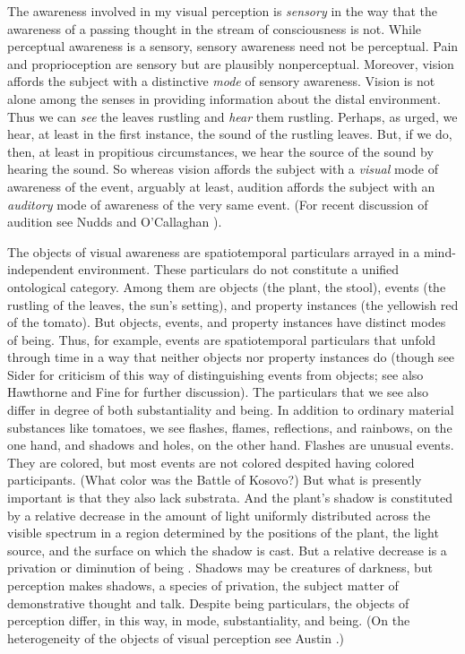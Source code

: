 \documentclass[12pt]{article}
\begin{document}
The awareness involved in my visual perception is \emph{sensory} in the way that the awareness of a passing thought in the stream of consciousness is not. While perceptual awareness is a sensory, sensory awareness need not be perceptual. Pain and proprioception are sensory but are plausibly nonperceptual. Moreover, vision affords the subject with a distinctive \emph{mode} of sensory awareness. Vision is not alone among the senses in providing information about the distal environment. Thus we can \emph{see} the leaves rustling and \emph{hear} them rustling. Perhaps, as \citet[]{Berkeley:1734fk} urged, we hear, at least in the first instance, the sound of the rustling leaves. But, if we do, then, at least in propitious circumstances, we hear the source of the sound by hearing the sound. So whereas vision affords the subject with a \emph{visual} mode of awareness of the event, arguably at least, audition affords the subject with an \emph{auditory} mode of awareness of the very same event. (For recent discussion of audition see Nudds and O'Callaghan \citeyear{Nudds:2009sk}).

The objects of visual awareness are spatiotemporal particulars arrayed in a mind-independent environment. These particulars do not constitute a unified ontological category. Among them are objects (the plant, the stool), events (the rustling of the leaves, the sun's setting), and property instances (the yellowish red of the tomato). But objects, events, and property instances have distinct modes of being. Thus, for example, events are spatiotemporal particulars that unfold through time in a way that neither objects nor property instances do (though see Sider \citeyear{Sider:1997fk} for criticism of this way of distinguishing events from objects; see also Hawthorne \citeyear{Hawthorne:2008uq} and Fine \citeyear{Fine:2006fk} for further discussion). The particulars that we see also differ in degree of both substantiality and being. In addition to ordinary material substances like tomatoes, we see flashes, flames, reflections, and rainbows, on the one hand, and shadows and holes, on the other hand. Flashes are unusual events. They are colored, but most events are not colored despited having colored participants. (What color was the Battle of Kosovo?) But what is presently important is that they also lack substrata. And the plant's shadow is constituted by a relative decrease in the amount of light uniformly distributed across the visible spectrum in a region determined by the positions of the plant, the light source, and the surface on which the shadow is cast. But a relative decrease is a privation or diminution of being \citep[see][]{Sorensen:2008kx}. Shadows may be creatures of darkness, but perception makes shadows, a species of privation, the subject matter of demonstrative thought and talk. Despite being particulars, the objects of perception differ, in this way, in mode, substantiality, and being. (On the heterogeneity of the objects of visual perception see Austin \citeyear{Austin:1962lr}.)
\end{document}
